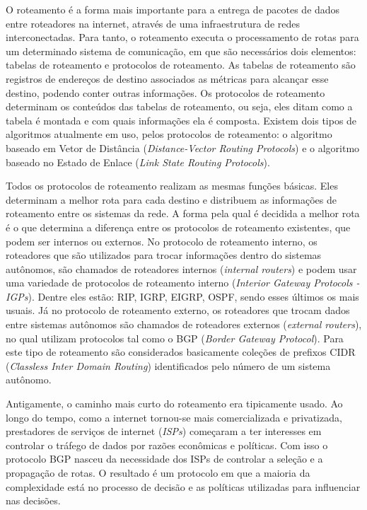 \documentclass[12pt,a4paper]{report}
\begin{document}
O roteamento \'e a forma mais importante para a entrega de pacotes de dados entre roteadores na internet, atrav\'es de uma infraestrutura de redes interconectadas. Para tanto, o roteamento executa o processamento de rotas para um determinado sistema de comunica\c{c}\~ao, em que s\~ao necess\'arios dois elementos: tabelas de roteamento e protocolos de roteamento. As tabelas de roteamento s\~ao registros de endere\c{c}os de destino associados as m\'etricas para alcan\c{c}ar esse destino, podendo conter outras informa\c{c}\~oes. Os protocolos de roteamento determinam os conte\'udos das tabelas de roteamento, ou seja, eles ditam como a tabela \'e montada e com quais informa\c{c}\~oes ela \'e composta. Existem dois tipos de algoritmos atualmente em uso, pelos protocolos de roteamento: o algoritmo baseado em Vetor de Dist\^ancia (\textit{Distance-Vector Routing Protocols}) e o algoritmo baseado no Estado de Enlace (\textit{Link State Routing Protocols}).

Todos os protocolos de roteamento realizam as mesmas fun\c{c}\~oes b\'asicas. Eles determinam a melhor rota para cada destino e distribuem as informa\c{c}\~oes de roteamento entre os sistemas da rede. A forma pela qual \'e decidida a melhor rota \'e o que determina a diferen\c{c}a entre os protocolos de roteamento existentes, que podem ser internos ou externos. No protocolo de roteamento interno, os roteadores que s\~ao utilizados para trocar informa\c{c}\~oes dentro do sistemas aut\^onomos, s\~ao chamados de roteadores internos (\textit{internal routers}) e podem usar uma variedade de protocolos de roteamento interno (\textit{Interior Gateway Protocols - IGPs}). Dentre eles est\~ao: RIP, IGRP, EIGRP, OSPF, sendo esses \'ultimos os mais usuais. J\'a no protocolo de roteamento externo, os roteadores que trocam dados entre sistemas aut\^onomos s\~ao chamados de roteadores externos (\textit{external routers}), no qual utilizam protocolos tal como o BGP (\textit{Border Gateway Protocol}). Para este tipo de roteamento s\~ao considerados basicamente cole\c{c}\~oes de prefixos CIDR (\textit{Classless Inter Domain Routing}) identificados pelo n\'umero de um sistema aut\^onomo.

Antigamente, o caminho mais curto do roteamento era tipicamente usado. Ao longo do tempo, como a internet tornou-se mais comercializada e privatizada, prestadores de servi\c{c}os de internet (\textit{ISPs}) come\c{c}aram a ter interesses em controlar o tr\'afego de dados por raz\~oes econ\^omicas e pol\'iticas. Com isso o protocolo BGP nasceu da necessidade dos ISPs de controlar a sele\c{c}\~ao e a propaga\c{c}\~ao de rotas. O resultado \'e um protocolo em que a maioria da complexidade est\'a no processo de decis\~ao e as pol\'iticas utilizadas para influenciar nas decis\~oes.
\end{document}

